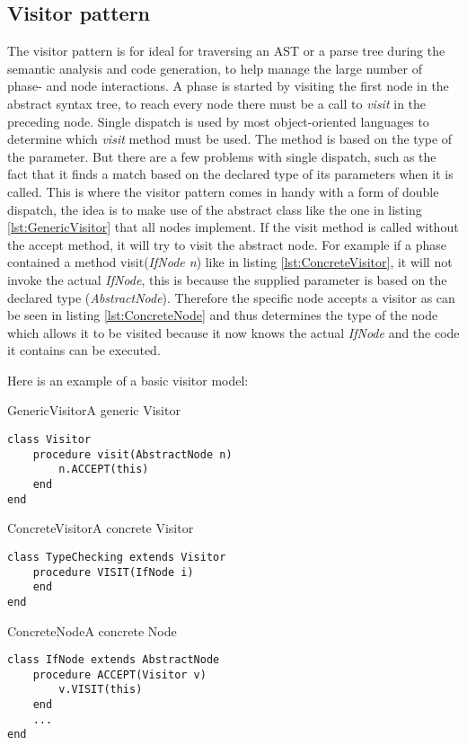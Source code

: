 \subsection{Visitor pattern}
\label{sec:VisitorPattern}
The visitor pattern is for ideal for traversing an AST or a parse tree during the semantic analysis and code generation, to help manage the large number of phase- and node interactions. A phase is started by visiting the first node in the abstract syntax tree, to reach every node there must be a call to \emph{visit} in the preceding node.
Single dispatch is used by most object-oriented languages to determine which \emph{visit} method must be used. The method is based on the type of the parameter. But there are a few problems with single dispatch, such as the fact that it finds a match based on the declared type of its parameters when it is called. This is where the visitor pattern comes in handy with a form of double dispatch, the idea is to make use of the abstract class like the one in listing \ref{lst:GenericVisitor} that all nodes implement. If the visit method is called without the accept method, it will try to visit the abstract node. For example if a phase contained a method visit(\textit{IfNode n}) like in listing \ref{lst:ConcreteVisitor}, it will not invoke the actual \textit{IfNode}, this is because the supplied parameter is based on the declared type (\textit{AbstractNode}). Therefore the specific node accepts a visitor as can be seen in listing \ref{lst:ConcreteNode} and thus determines the type of the node which allows it to be visited because it now knows the actual \textit{IfNode} and the code it contains can be executed.

Here is an example of a basic visitor model:

\begin{code}{GenericVisitor}{A generic Visitor}
\begin{lstlisting}
class Visitor
	procedure visit(AbstractNode n)
		n.ACCEPT(this)
	end
end
\end{lstlisting}
\end{code}

\begin{code}{ConcreteVisitor}{A concrete Visitor}
\begin{lstlisting}
class TypeChecking extends Visitor
	procedure VISIT(IfNode i)
	end
end
\end{lstlisting}
\end{code}

\begin{code}{ConcreteNode}{A concrete Node}
\begin{lstlisting}
class IfNode extends AbstractNode
	procedure ACCEPT(Visitor v)
		v.VISIT(this)
	end
	...
end
\end{lstlisting}
\end{code}